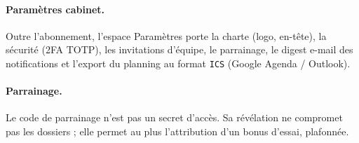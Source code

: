\paragraph{Paramètres cabinet.}
Outre l'abonnement, l'espace Paramètres porte la charte (logo, en-tête), la sécurité (2FA TOTP), les invitations d'équipe, le parrainage, le digest e-mail des notifications et l'export du planning au format \texttt{ICS} (Google Agenda / Outlook).

\paragraph{Parrainage.}
\label{sec:parrainage}
Le code de parrainage n'est pas un secret d'accès. Sa révélation ne compromet pas les dossiers ; elle permet au plus l'attribution d'un bonus d'essai, plafonnée.

